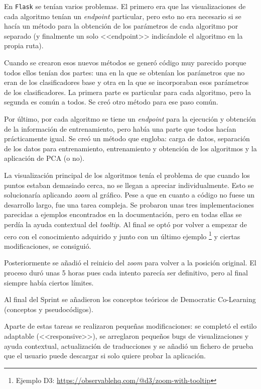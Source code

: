 En \texttt{Flask} se tenían varios problemas. El primero era que las
visualizaciones de cada algoritmo tenían un \textit{endpoint} particular, pero
esto no era necesario si se hacía un método para la obtención de los parámetros
de cada algoritmo por separado (y finalmente un solo <<endpoint>> indicándole el
algoritmo en la propia ruta). 

Cuando se crearon esos nuevos métodos se generó código muy parecido porque todos
ellos tenían dos partes: una en la que se obtenían los parámetros que no eran de
los clasificadores base y otra en la que se incorporaban esos parámetros de los
clasificadores. La primera parte es particular para cada algoritmo, pero la
segunda es común a todos. Se creó otro método para ese paso común. 

Por último, por cada algoritmo se tiene un \textit{endpoint} para la ejecución y
obtención de la información de entrenamiento, pero había una parte que todos
hacían prácticamente igual. Se creó un método que engloba: carga de datos,
separación de los datos para entrenamiento, entrenamiento y obtención de los
algoritmos y la aplicación de PCA (o no).

La visualización principal de los algoritmos tenía el problema de que cuando los
puntos estaban demasiado cerca, no se llegan a apreciar individualmente. Esto se
solucionaría aplicando \textit{zoom} al gráfico. Pese a que en cuanto a código
no fuese un desarrollo largo, fue una tarea compleja. Se probaron unas tres
implementaciones parecidas a ejemplos encontrados en la documentación, pero en
todas ellas se perdía la ayuda contextual del \textit{tooltip}. Al final se optó
por volver a empezar de cero con el conocimiento adquirido y junto con un último
ejemplo \footnote{Ejemplo D3:
\url{https://observablehq.com/@d3/zoom-with-tooltip}} y ciertas modificaciones,
se consiguió. 

Posteriormente se añadió el reinicio del \textit{zoom} para volver a la posición
original. El proceso duró unas 5 horas pues cada intento parecía ser definitivo,
pero al final siempre había ciertos límites.

Al final del Sprint se añadieron los conceptos teóricos de Democratic
Co-Learning (conceptos y pseudocódigos).

Aparte de estas tareas se realizaron pequeñas modificaciones: se completó el
estilo adaptable (<<responsive>>), se arreglaron pequeños bugs de
visualizaciones y ayuda contextual, actualización de traducciones y se añadió un
fichero de prueba que el usuario puede descargar si solo quiere probar la
aplicación.

